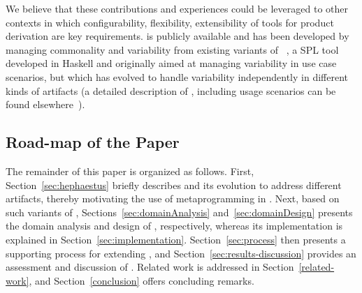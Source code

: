 We believe that these contributions and experiences could be leveraged to other contexts in which configurability, flexibility, extensibility of tools for product derivation are key requirements. \hpl{} is publicly available  and has been developed by managing commonality and variability from existing variants of \hp~\cite{rbonifacio:sbcars2009}, a SPL tool developed in Haskell and originally aimed at managing variability in use case scenarios, but which has evolved to handle variability independently in different kinds of artifacts (a detailed description of \hp, including usage scenarios can be found elsewhere~\cite{rbonifacio:sbcars2009}). 


\bigskip

\subsection*{Road-map of the Paper}

The remainder of this paper is organized as follows. First, Section~\ref{sec:hephaestus} briefly describes \hp{} and its evolution to address different artifacts, thereby motivating the use of metaprogramming in \hpl. Next, based on such variants of \hp, Sections~\ref{sec:domainAnalysis} and~\ref{sec:domainDesign} presents the domain analysis and design of \hpl, respectively, whereas its implementation is explained in Section~\ref{sec:implementation}. Section~\ref{sec:process} then presents a supporting process for extending \hpl, and Section~\ref{sec:results-discussion} provides an assessment and discussion of \hpl. Related work is addressed in Section~\ref{related-work}, and Section~\ref{conclusion} offers concluding remarks.

